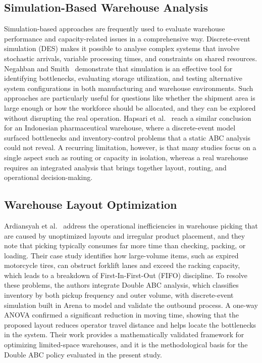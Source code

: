 \documentclass[12pt,a4paper]{article}
\begin{document}
\subsection{Simulation-Based Warehouse Analysis}
Simulation-based approaches are frequently used to evaluate warehouse
performance and capacity-related issues in a comprehensive way.
Discrete-event simulation (DES) makes it possible to analyse complex systems
that involve stochastic arrivals, variable processing times, and constraints
on shared resources. Negahban and Smith~\cite{negahban2014} demonstrate that
simulation is an effective tool for identifying bottlenecks, evaluating
storage utilization, and testing alternative system configurations in both
manufacturing and warehouse environments. Such approaches are particularly
useful for questions like whether the shipment area is large enough or how the
workforce should be allocated, and they can be explored without disrupting the
real operation. Hapsari et al.~\cite{hapsari2025} reach a similar conclusion
for an Indonesian pharmaceutical warehouse, where a discrete-event model
surfaced bottlenecks and inventory-control problems that a static ABC analysis
could not reveal. A recurring limitation, however, is that many studies focus
on a single aspect such as routing or capacity in isolation, whereas a real
warehouse requires an integrated analysis that brings together layout,
routing, and operational decision-making.

\subsection{Warehouse Layout Optimization}
Ardiansyah et al.~\cite{ardiansyah2024} address the operational inefficiencies
in warehouse picking that are caused by unoptimized layouts and irregular
product placement, and they note that picking typically consumes far more time
than checking, packing, or loading. Their case study identifies how
large-volume items, such as expired motorcycle tires, can obstruct forklift
lanes and exceed the racking capacity, which leads to a breakdown of
First-In-First-Out (FIFO) discipline. To resolve these problems, the authors
integrate Double ABC analysis, which classifies inventory by both pickup
frequency and outer volume, with discrete-event simulation built in Arena to
model and validate the outbound process. A one-way ANOVA confirmed a
significant reduction in moving time, showing that the proposed layout reduces
operator travel distance and helps locate the bottlenecks in the system. Their
work provides a mathematically validated framework for optimizing
limited-space warehouses, and it is the methodological basis for the Double
ABC policy evaluated in the present study.
\end{document}
